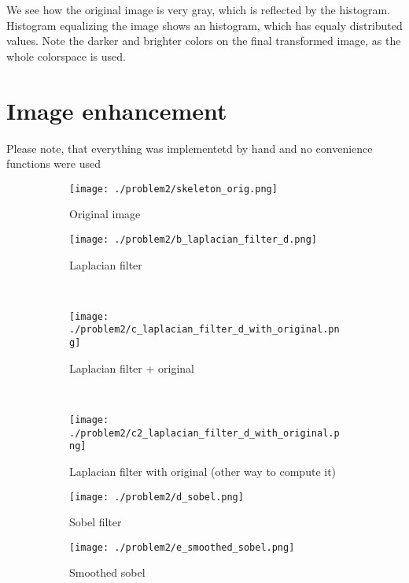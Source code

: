 \documentclass[a4paper]{scrartcl}
\begin{document}
We see how the original image is very gray, which is reflected by the histogram. Histogram equalizing the image shows an histogram, which has equaly distributed values. Note the darker and brighter colors on the final transformed image, as the whole colorspace is used.
\section{Image enhancement}

Please note, that everything was implementetd by hand and no convenience functions were used

\begin{figure}[H]
    \centering
    \begin{subfigure}[t]{0.3\textwidth}
        \texttt{[image: ./problem2/skeleton\_orig.png]}
        \caption{Original image}
    \end{subfigure}
    \begin{subfigure}[t]{0.3\textwidth}
        \texttt{[image: ./problem2/b\_laplacian\_filter\_d.png]}
        \caption{Laplacian filter}
    \end{subfigure}
    ~ %
    \begin{subfigure}[t]{0.3\textwidth}
        \texttt{[image: ./problem2/c\_laplacian\_filter\_d\_with\_original.png]}
        \caption{Laplacian filter + original}
    \end{subfigure}
    ~ %
    \begin{subfigure}[t]{0.3\textwidth}
        \texttt{[image: ./problem2/c2\_laplacian\_filter\_d\_with\_original.png]}
        \caption{Laplacian filter with original (other way to compute it)}
    \end{subfigure}
    \begin{subfigure}[t]{0.3\textwidth}
        \texttt{[image: ./problem2/d\_sobel.png]}
        \caption{Sobel filter}
    \end{subfigure}
    \begin{subfigure}[t]{0.3\textwidth}
        \texttt{[image: ./problem2/e\_smoothed\_sobel.png]}
        \caption{Smoothed sobel}
    \end{subfigure}
    \begin{subfigure}[t]{0.3\textwidth}

\end{subfigure}
\end{figure}
\end{document}
